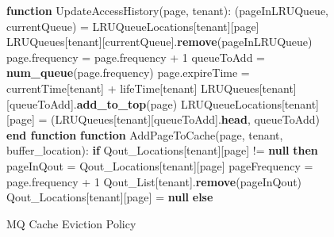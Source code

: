 \begin{figure}[htbp]
    \centering
    \begin{minipage}{\linewidth}
    \begin{algorithm}[H]
        \caption{MQ Cache Eviction Policy}
        \begin{algorithmic}
            \STATE \textbf{function} UpdateAccessHistory(page, tenant):
            \STATE \hspace{\algorithmicindent} (pageInLRUQueue, currentQueue) = LRUQueueLocations[tenant][page]
            \STATE \hspace{\algorithmicindent} LRUQueues[tenant][currentQueue].\textbf{remove}(pageInLRUQueue)
            \STATE \hspace{\algorithmicindent} page.frequency = page.frequency + 1
            \STATE \hspace{\algorithmicindent} queueToAdd = \textbf{num\_queue}(page.frequency)
            \STATE \hspace{\algorithmicindent} page.expireTime = currentTime[tenant] + lifeTime[tenant]
            \STATE \hspace{\algorithmicindent} LRUQueues[tenant][queueToAdd].\textbf{add\_to\_top}(page)
            \STATE \hspace{\algorithmicindent} LRUQueueLocations[tenant][page] = (LRUQueues[tenant][queueToAdd].\textbf{head}, queueToAdd)
            \STATE \textbf{end function}
            \STATE
            \STATE \textbf{function} AddPageToCache(page, tenant, buffer\_location):
            \STATE \hspace{\algorithmicindent} \textbf{if} Qout\_Locations[tenant][page] != \textbf{null} \textbf{then}
            \STATE \hspace{\algorithmicindent} \hspace{\algorithmicindent} pageInQout = Qout\_Locations[tenant][page]
            \STATE \hspace{\algorithmicindent} \hspace{\algorithmicindent} pageFrequency = page.frequency + 1
            \STATE \hspace{\algorithmicindent} \hspace{\algorithmicindent} Qout\_List[tenant].\textbf{remove}(pageInQout)
            \STATE \hspace{\algorithmicindent} \hspace{\algorithmicindent} Qout\_Locations[tenant][page] = \textbf{null}
            \STATE \hspace{\algorithmicindent} \textbf{else}

\end{algorithmic}
\end{algorithm}
\end{minipage}
\end{figure}
